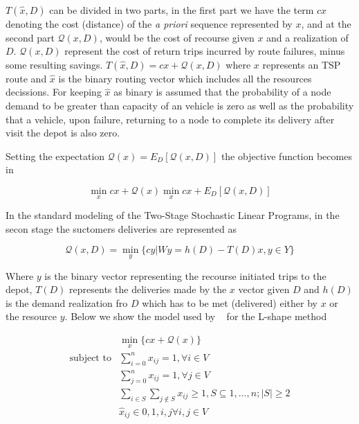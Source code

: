 $T(\hat{x},D)$ can be divided in two parts, in the first part we have the term $cx$ denoting the cost (distance) of the \textit{a priori} sequence represented by $x$, and at the second part $\mathcal{Q}(x,D)$, would be the cost of recourse given $x$ and a realization of $D$. $\mathcal{Q}(x,D)$ represent the cost of return trips incurred by route failures, minus some resulting savings.
$T(\hat{x},D) = cx+\mathcal{Q}(x,D)$ where $x$ represents an TSP route and $\hat{x}$ is the binary routing vector which includes all the resources decissions. For keeping $\hat{x}$ as binary is assumed that the probability of a node demand to be greater than capacity of an vehicle is zero as well as the probability that a vehicle, upon failure, returning to a node to complete its delivery after visit the depot is also zero.

Setting the expectation $\mathcal{Q}(x) = E_D[\mathcal{Q}(x,D)]$ the objective function becomes in

\begin{equation}\label{eq:SPR_objective}
 \min\limits_x{cx+\mathcal{Q}(x)} \min\limits_x{cx+E_D[\mathcal{Q}(x,D)]}
\end{equation}

In the standard modeling of the Two-Stage Stochastic Linear Programs, in the secon stage the suctomers deliveries are represented as

\begin{equation}\label{eq:SPR_second_stage}
 \mathcal{Q}(x,D)=\min\limits_y\{cy|Wy=h(D)-T(D)x, y \in Y\}
\end{equation}

Where $y$ is the binary vector representing the recourse initiated trips to the depot, $T(D)$ represents the deliveries made by the $x$ vector given $D$ and $h(D)$ is the demand realization fro $D$ which has to be met (delivered) either by $x$ or the resource $y$. Below we show the model used by ~\cite{laporte_integer_2002} for the L-shape method

\begin{align}\label{eq:SPR_lshape}
  & \min\limits_{x} \{cx+\mathcal{Q}(x)\}\\ 
 \text{subject to} & \sum_{i=0}^nx_{ij} = 1, \forall i \in V\\
  & \sum_{j=0}^nx_{ij} = 1, \forall j \in V\\
  & \sum_{i\in S}\sum_{j\notin S}x_{ij} \geq 1, S\subseteq {1,\ldots,n};|S|\geq2\\
  & \hat{x}_{ij} \in {0,1}, i,j \forall i,j \in V
\end{align}

